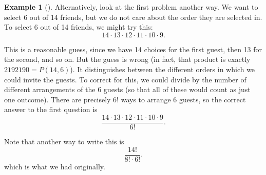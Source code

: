 \documentclass[10pt,]{book}
\theoremstyle{plain}
\theoremstyle{definition}
\newtheorem{example}[theorem]{Example}
\theoremstyle{definition}
\theoremstyle{definition}
\numberwithin{equation}{chapter}
\begin{document}
\begin{example}[]
              Alternatively, look at the first problem another way. We want to select 6 out of 14 friends, but we do not care about the order they are selected in. To select 6 out of 14 friends, we might try this:
              \begin{equation*}
                14 \cdot 13 \cdot 12 \cdot 11 \cdot 10 \cdot 9.
              \end{equation*}
\par

              This is a reasonable guess, since we have 14 choices for the first guest, then 13 for the second, and so on. But the guess is wrong (in fact, that product is exactly \(2192190 = P(14,6)\)). It distinguishes between the different orders in which we could invite the guests. To correct for this, we could divide by the number of different arrangements of the 6 guests (so that all of these would count as just one outcome). There are precisely \(6!\) ways to arrange 6 guests, so the correct answer to the first question is
              \begin{equation*}
                \frac{14 \cdot 13 \cdot 12 \cdot 11\cdot 10 \cdot 9}{6!}.
              \end{equation*}
\par

              Note that another way to write this is
              \begin{equation*}
                \frac{14!}{8!\cdot 6!}.
              \end{equation*}
              which is what we had originally.
\end{example}
\typeout{************************************************}
\typeout{************************************************}
\end{document}
